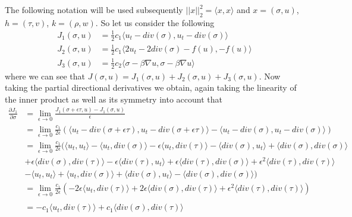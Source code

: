 \documentclass[fleqn, a4paper, 11pt, bibliography=totoc]{report}
\begin{document}
The following notation will be used subsequently $ || x ||_2^2 = \langle x , x \rangle$ and $ x = (\sigma, u)$, $h = (\tau, v)$, $k = (\rho, w)$. So let us consider the following 
\begin{equation}
\begin{aligned}
J_1(\sigma, u) &= \frac{1}{2}c_1\langle u_t - div(\sigma), u_t - div(\sigma) \rangle \\
J_2(\sigma, u) &= \frac{1}{2} c_1 \langle 2 u_t - 2 div(\sigma) - f(u), - f(u) \rangle \\
J_3(\sigma, u) &= \frac{1}{2} c_2\langle \sigma - \beta \nabla u, \sigma  - \beta \nabla u \rangle
\end{aligned}
\end{equation}
where we can see that $J(\sigma, u) = J_1(\sigma, u) + J_2(\sigma, u) + J_3(\sigma, u)$. Now taking the partial directional derivatives we obtain, again taking the linearity of the inner product as well as its symmetry into account that
\begin{equation}
\begin{aligned}
\frac{\partial J_1}{\partial \sigma} &= \lim_{\epsilon \rightarrow 0} \frac{J_1(\sigma + \epsilon \tau, u) - J_1(\sigma, u)}{\epsilon}  \\ 
&= \lim_{\epsilon \rightarrow 0} \frac{c_1}{2 \epsilon} (\langle u_t - div(\sigma + \epsilon \tau), u_t - div(\sigma + \epsilon \tau) \rangle - \langle u_t - div(\sigma), u_t - div(\sigma) \rangle) \\
&=  \lim_{\epsilon \rightarrow 0} \frac{c_1}{2 \epsilon} (\langle u_t, u_t \rangle - \langle u_t, div(\sigma) \rangle - \epsilon \langle u_t, div(\tau) \rangle - \langle div(\sigma), u_t \rangle + \langle div(\sigma), div(\sigma) \rangle \\ &+ \epsilon \langle div(\sigma), div(\tau) \rangle - \epsilon \langle div(\tau), u_t \rangle + \epsilon \langle div(\tau), div(\sigma) \rangle + \epsilon^2 \langle div(\tau), div(\tau) \rangle \\
& - \langle u_t, u_t \rangle + \langle u_t, div(\sigma) \rangle + \langle div(\sigma), u_t \rangle - \langle div(\sigma), div(\sigma) \rangle) \\
&= \lim_{\epsilon \rightarrow 0} \frac{c_1}{2 \epsilon} (- 2 \epsilon \langle u_t, div(\tau) \rangle + 2 \epsilon \langle div(\sigma), div(\tau) \rangle + \epsilon^2 \langle div(\tau), div(\tau) \rangle )
\\
\\
&= - c_1 \langle u_t, div(\tau) \rangle + c_1 \langle div(\sigma), div(\tau) \rangle
\end{aligned}
\end{equation}
\end{document}
